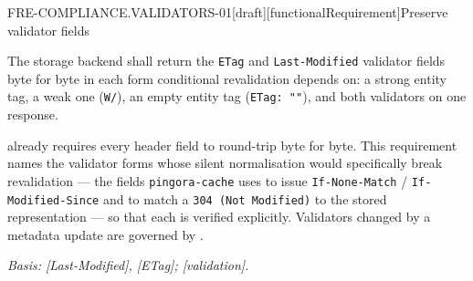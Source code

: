 \begin{requirement}{FRE-COMPLIANCE.VALIDATORS-01}[draft][functionalRequirement]{Preserve validator fields}


  The storage backend shall return the \texttt{ETag} and \texttt{Last-Modified}
  validator fields byte for byte in each form conditional revalidation depends
  on: a strong entity tag, a weak one (\texttt{W/}), an empty entity tag
  (\texttt{ETag: ""}), and both validators on one response.

   already requires every header field to
  round-trip byte for byte. This requirement names the validator forms whose
  silent normalisation would specifically break revalidation --- the fields
  \texttt{pingora-cache} uses to issue \texttt{If-None-Match} /
  \texttt{If-Modified-Since} and to match a \texttt{304 (Not Modified)} to the
  stored representation --- so that each is verified explicitly. Validators
  changed by a metadata update are governed by
  .

  \textit{Basis: [Last-Modified], [ETag];
  [validation].}



\end{requirement}

